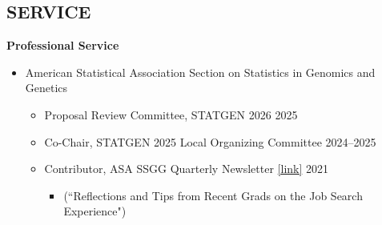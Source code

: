 \documentclass[margin]{res}
\newcommand{\annotateItem}[1]{
	\begin{itemize} \vspace{-0.1cm}
	\item[] 
	\begin{footnotesize}\textcolor{black}{(#1)}\end{footnotesize}
	\end{itemize} \vspace{-0.1cm}
}
\begin{document}
\begin{resume}
\section{SERVICE}  

\textbf{Professional Service}
	\begin{itemize}
	
	\item American Statistical Association Section on Statistics in Genomics and Genetics
		\begin{itemize}
		
		\item Proposal Review Committee, STATGEN 2026  \hfill 2025
		
		\item Co-Chair, STATGEN 2025 Local Organizing Committee \hfill 2024--2025
		
		
		\item Contributor, ASA SSGG Quarterly Newsletter \href{https://higherlogicdownload.s3.amazonaws.com/AMSTAT/6d11267c-5862-4c31-9f1e-f5a52a11ea5f/UploadedImages/Newsletters/Newsletter_SSGG_2021Sept_final.pdf}{[link]} \hfill 2021
			\begin{itemize}[leftmargin=-0in] \vspace{-0.2cm}
			\item[]  \begin{footnotesize}(``Reflections and Tips from Recent Grads on the Job Search Experience") \end{footnotesize}
			\end{itemize} %
		

\end{itemize}
\end{itemize}
\end{resume}
\end{document}
